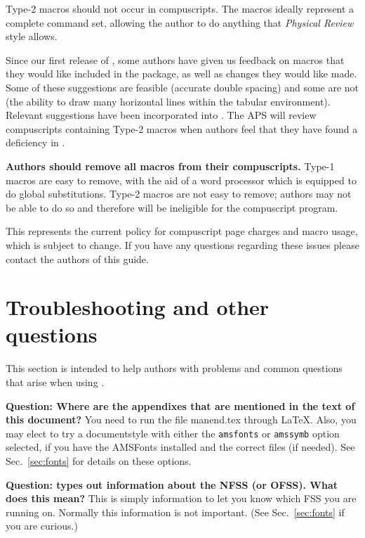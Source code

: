 Type-2 macros should not occur in \REVTeX{} compuscripts. The \REVTeX{}
macros ideally represent a complete command set, allowing the author to do
anything that {\em Physical Review\/} style allows.

Since our first release of \REVTeX{}, some authors have given us feedback
on macros that they would like included in the \REVTeX{} package, as well
as changes they would like made.  Some of these suggestions are feasible
(accurate double spacing) and some are not (the ability to draw many
horizontal lines within the tabular environment). Relevant suggestions have
been incorporated into \REVTeX{}.  The APS will review compuscripts
containing Type-2 macros when authors feel that they have found a
deficiency in \REVTeX{}.

{\bf Authors should remove all macros from their compuscripts.} Type-1
macros are easy to remove, with the aid of a word processor which is
equipped to do global substitutions. Type-2 macros are not easy to remove;
authors may not be able to do so and therefore will be ineligible for the
compuscript program.

This represents the current policy for compuscript page charges and macro
usage, which is subject to change. If you have any questions regarding
these issues please contact the authors of this guide.

\section{Troubleshooting and other questions}

This section is intended to help authors with problems  and common
questions that arise when using \REVTeX{}.

{\bf Question: Where are the appendixes that are mentioned in the text of
this document?} You need to run the file manend.tex through \LaTeX. Also,
you may elect to try a documentstyle with either the \verb+amsfonts+ or
\verb+amssymb+ option selected, if you have the AMSFonts installed and the
correct \AmSLaTeX{} files (if needed). See Sec.\ \ref{sec:fonts} for
details on these options.

{\bf Question: \REVTeX{} types out information about the NFSS (or OFSS).
What does this mean?} This is simply information to let you know which FSS
you are running on. Normally this information is not important. (See Sec.\
\ref{sec:fonts} if you are curious.)


